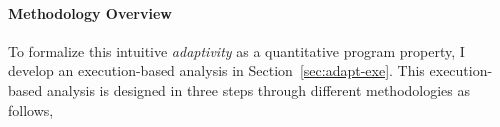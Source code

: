 \paragraph{Methodology Overview}
 To formalize this intuitive \emph{adaptivity} as a quantitative program property, 
I develop an execution-based analysis in Section~\ref{sec:adapt-exe}.
 This execution-based analysis is designed in three steps through different methodologies as follows,
